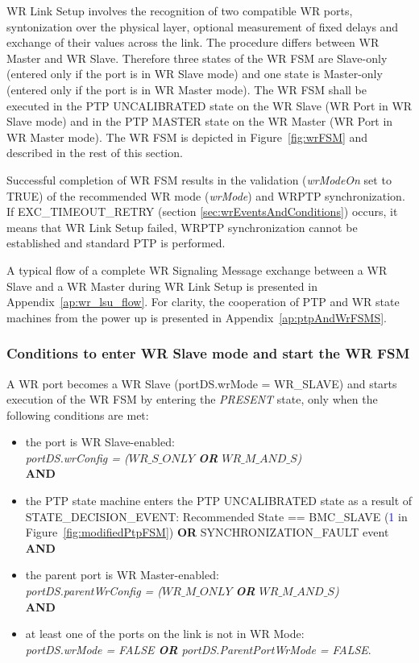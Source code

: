 \documentclass[a4paper, 12pt]{article}
\begin{document}
WR Link Setup involves the recognition of two 
compatible WR ports, syntonization over the physical layer, optional measurement of fixed delays and 
exchange of their values across the link. The procedure differs between WR Master and WR Slave. 
Therefore three states of the WR FSM are Slave-only (entered only if the port is in WR Slave mode) 
and one state is Master-only (entered only if the port is in WR Master mode). The WR FSM shall be 
executed in the PTP UNCALIBRATED state on the WR Slave (WR Port in WR Slave mode) and in 
the PTP MASTER state on the WR Master (WR Port in WR Master mode).
The WR FSM is depicted in Figure~\ref{fig:wrFSM} and described in the rest of this section.

Successful completion of WR FSM results in the validation (\textit{wrModeOn} set to TRUE) 
of the recommended WR mode (\textit{wrMode}) and WRPTP synchronization. If EXC\_TIMEOUT\_RETRY 
(section \ref{sec:wrEventsAndConditions}) occurs, it means that WR Link Setup failed, 
WRPTP synchronization cannot be established and standard PTP is performed.

A typical flow of a complete WR Signaling Message exchange between a WR Slave and a WR Master 
during WR Link Setup is presented in Appendix~\ref{ap:wr_lsu_flow}. For clarity, the cooperation of 
PTP and WR state machines from the power up is presented in Appendix~\ref{ap:ptpAndWrFSMS}.

\subsubsection{Conditions to enter WR Slave mode and start the WR FSM}
\label{sec:wrSlaveFSMstart}


A WR port becomes a WR Slave (portDS.wrMode = WR\_SLAVE) and starts execution 
of the WR FSM by entering the \textit{PRESENT} state, only when the following conditions are met:
\begin{itemize}
\item the port is WR Slave-enabled: \\ 
      \textit{portDS.wrConfig = ($WR\_S\_ONLY$ \textbf{OR} $WR\_M\_AND\_S$)}\\ 
      \textbf{AND}
\item the PTP state machine enters the PTP UNCALIBRATED state as a result of \\
      STATE\_DECISION\_EVENT:
      Recommended State == BMC\_SLAVE (\textcolor{blue}{1} in Figure~\ref{fig:modifiedPtpFSM})
      \textbf{OR} SYNCHRONIZATION\_FAULT event\\
      \textbf{AND}
\item the parent port is WR Master-enabled: \\ 
      \textit{portDS.parentWrConfig = ($WR\_M\_ONLY$ \textbf{OR} $WR\_M\_AND\_S$)} \\ 
      \textbf{AND}
\item at least one of the ports on the link is not in WR Mode:  \\ 
      \textit{portDS.wrMode = FALSE \textbf{OR} portDS.ParentPortWrMode = FALSE}.
\end{itemize}
\end{document}
